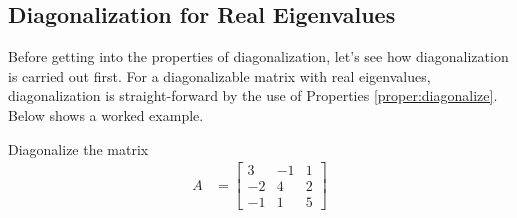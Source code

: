 \subsection{Diagonalization for Real Eigenvalues}
\label{section:realeigen}

Before getting into the properties of diagonalization, let's see how diagonalization is carried out first. For a diagonalizable matrix with real eigenvalues, diagonalization is straight-forward by the use of Properties \ref{proper:diagonalize}. Below shows a worked example.
\begin{exmp}
Diagonalize the matrix 
\begin{align*}
A &= 
\begin{bmatrix}
3 & -1 & 1 \\
-2 & 4 & 2 \\
-1 & 1 & 5
\end{bmatrix}
\end{align*}
\end{exmp}
